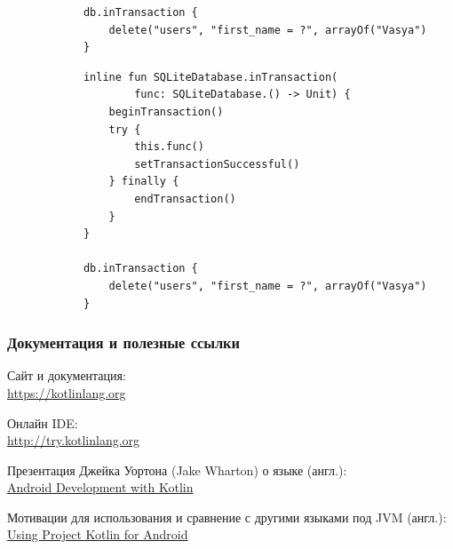 \documentclass{beamer}
\begin{document}
\begin{frame}[fragile, t]
\begin{overprint}
\begin{verbatim}
            db.inTransaction {
                delete("users", "first_name = ?", arrayOf("Vasya")
            }
        \end{verbatim}

        \begin{verbatim}
            inline fun SQLiteDatabase.inTransaction(
                    func: SQLiteDatabase.() -> Unit) {
                beginTransaction()
                try {
                    this.func()
                    setTransactionSuccessful()
                } finally {
                    endTransaction()
                }
            }

            db.inTransaction {
                delete("users", "first_name = ?", arrayOf("Vasya")
            }
        \end{verbatim}
    \end{overprint}
\end{frame}

\begin{frame}
    \frametitle{Документация и полезные ссылки}
    \begin{description}
        \item Сайт и документация: \\
            \url{https://kotlinlang.org}
        \item Онлайн IDE: \\
            \url{http://try.kotlinlang.org}
        \item Презентация Джейка Уортона (Jake Wharton) о языке (англ.): \\
            \href{http://www.youtube.com/watch?v=A2LukgT2mKc}{Android Development with Kotlin}
        \item Мотивации для использования и сравнение с другими языками под JVM (англ.): \\
            \href{https://docs.google.com/document/d/1ReS3ep-hjxWA8kZi0YqDbEhCqTt29hG8P44aA9W0DM8/edit?hl=en&forcehl=1}{Using Project Kotlin for Android}
    \end{description}
\end{frame}
\end{document}
